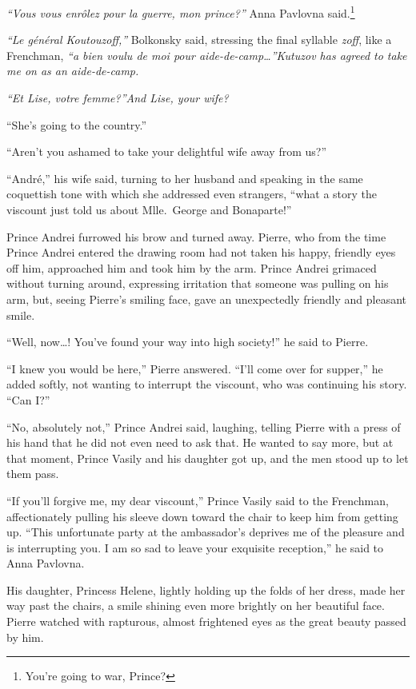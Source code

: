 \textit{``Vous vous enr\^olez pour la guerre, mon prince?''} Anna
Pavlovna said.\footnote{You're going to war, Prince?}

\textit{``Le g\'en\'eral Koutouzoff,''} Bolkonsky said, stressing the
final syllable \textit{zoff}, like a Frenchman, \textit{``a bien voulu
  de moi pour aide-de-camp\ldots{}''}\textit{Kutuzov has agreed to
  take me on as an aide-de-camp.}

\textit{``Et Lise, votre femme?''}\textit{And Lise, your wife?}

``She's going to the country.''

``Aren't you ashamed to take your delightful wife away from us?''

``Andr\'e,'' his wife said, turning to her husband and speaking in the
same coquettish tone with which she addressed even strangers, ``what a
story the viscount just told us about Mlle.~George and Bonaparte!''

Prince Andrei furrowed his brow and turned away. Pierre, who from the
time Prince Andrei entered the drawing room had not taken his happy,
friendly eyes off him, approached him and took him by the arm. Prince
Andrei grimaced without turning around, expressing irritation that
someone was pulling on his arm, but, seeing Pierre's smiling face,
gave an unexpectedly friendly and pleasant smile.

``Well, now\ldots{}! You've found your way into high society!'' he
said to Pierre.

``I knew you would be here,'' Pierre answered. ``I'll come over for
supper,'' he added softly, not wanting to interrupt the viscount, who
was continuing his story. ``Can I?''

``No, absolutely not,'' Prince Andrei said, laughing, telling Pierre
with a press of his hand that he did not even need to ask that. He
wanted to say more, but at that moment, Prince Vasily and his daughter
got up, and the men stood up to let them pass.

``If you'll forgive me, my dear viscount,'' Prince Vasily said to the
Frenchman, affectionately pulling his sleeve down toward the chair to
keep him from getting up. ``This unfortunate party at the ambassador's
deprives me of the pleasure and is interrupting you. I am so sad to
leave your exquisite reception,'' he said to Anna Pavlovna.

His daughter, Princess Helene, lightly holding up the folds of her
dress, made her way past the chairs, a smile shining even more
brightly on her beautiful face. Pierre watched with rapturous, almost
frightened eyes as the great beauty passed by him.

